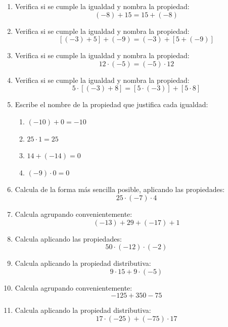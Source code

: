 \documentclass[12pt, letterpaper]{article}
\begin{document}
\begin{enumerate}[leftmargin=*, start=75]
  \item \medio{} Verifica si se cumple la igualdad y nombra la propiedad:
        \[
          (-8) + 15 = 15 + (-8)
        \]

  \item \medio{} Verifica si se cumple la igualdad y nombra la propiedad:
        \[
          [(-3) + 5] + (-9) = (-3) + [5 + (-9)]
        \]

  \item \medio{} Verifica si se cumple la igualdad y nombra la propiedad:
        \[
          12 \cdot (-5) = (-5) \cdot 12
        \]

  \item \medio{} Verifica si se cumple la igualdad y nombra la propiedad:
        \[
          5 \cdot [(-3) + 8] = [5 \cdot (-3)] + [5 \cdot 8]
        \]

  \item \medio{} Escribe el nombre de la propiedad que justifica cada igualdad:
        \begin{enumerate}[label=\alph*)]
          \item $(-10) + 0 = -10$
          \item $25 \cdot 1 = 25$
          \item $14 + (-14) = 0$
          \item $(-9) \cdot 0 = 0$
        \end{enumerate}

  \item \dificil{} Calcula de la forma más sencilla posible, aplicando las propiedades:
        \[
          25 \cdot (-7) \cdot 4
        \]

  \item \dificil{} Calcula agrupando convenientemente:
        \[
          (-13) + 29 + (-17) + 1
        \]

  \item \dificil{} Calcula aplicando las propiedades:
        \[
          50 \cdot (-12) \cdot (-2)
        \]

  \item \dificil{} Calcula aplicando la propiedad distributiva:
        \[
          9 \cdot 15 + 9 \cdot (-5)
        \]

  \item \dificil{} Calcula agrupando convenientemente:
        \[
          -125 + 350 - 75
        \]

  \item \dificil{} Calcula aplicando la propiedad distributiva:
        \[
          17 \cdot (-25) + (-75) \cdot 17
        \]


\end{enumerate}
\end{document}
